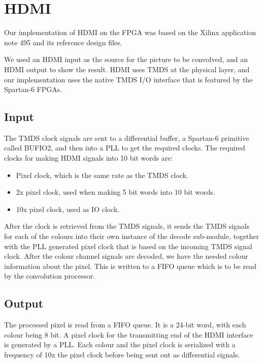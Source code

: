 \section{HDMI}
Our implementation of HDMI on the FPGA was based on the Xilinx application note 495 \cite{xapp495} and its reference design files.

We used an HDMI input as the source for the picture to be convolved, and an HDMI output to show the result.
HDMI uses TMDS at the physical layer, and our implementation uses the native TMDS I/O interface that is featured by the Spartan-6 FPGAs.

\subsection{Input}
The TMDS clock signals are sent to a differential buffer, a Spartan-6 primitive called BUFIO2, and then into a PLL to get the required clocks. The required clocks for making HDMI signals into 10 bit words are:
\begin{itemize}
    \item   Pixel clock, which is the same rate as the TMDS clock.
    \item   2x pixel clock, used when making 5 bit words into 10 bit words.
    \item   10x pixel clock, used as IO clock.
\end{itemize}

After the clock is retrieved from the TMDS signals, it sends the TMDS signals for each of the colours into their own instance of the decode sub-module, together with the PLL generated pixel clock that is based on the incoming TMDS signal clock.
After the colour channel signals are decoded, we have the needed colour information about the pixel.
This is written to a FIFO queue which is to be read by the convolution processor.

\subsection{Output}

The processed pixel is read from a FIFO queue. It is a 24-bit word, with each colour being 8 bit. A pixel clock for the transmitting end of the HDMI interface is generated by a PLL. Each colour and the pixel clock is serialized with a frequency of 10x the pixel clock before being sent out as differential signals.
